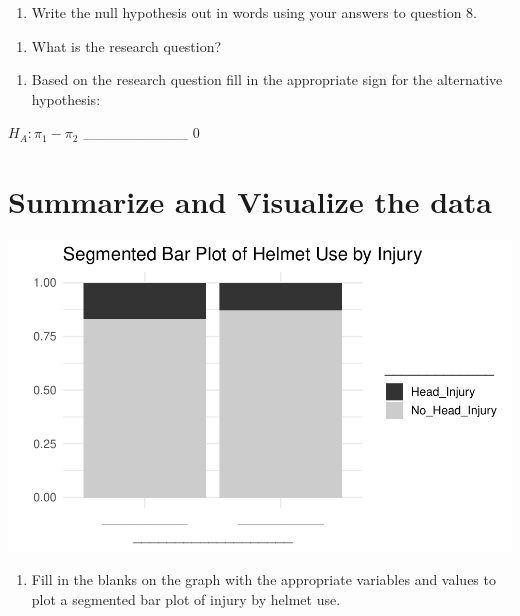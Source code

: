 \documentclass[
]{report}
\providecommand{\tightlist}{%
  \setlength{\itemsep}{0pt}\setlength{\parskip}{0pt}}
\begin{document}
\begin{enumerate}
\def\labelenumi{\arabic{enumi}.}
\setcounter{enumi}{8}
\tightlist
\item
  Write the null hypothesis out in words using your answers to question 8.
\end{enumerate}

\vspace{1in}

\begin{enumerate}
\def\labelenumi{\arabic{enumi}.}
\setcounter{enumi}{9}
\tightlist
\item
  What is the research question?
\end{enumerate}

\vspace{1in}

\begin{enumerate}
\def\labelenumi{\arabic{enumi}.}
\setcounter{enumi}{10}
\tightlist
\item
  Based on the research question fill in the appropriate sign for the alternative hypothesis:
  \vspace{0.25in}
\end{enumerate}

\(H_A: \pi_1 -\pi_2\) \_\_\_\_\_\_\_\_\_\_ 0

\hypertarget{summarize-and-visualize-the-data}{%
\section{Summarize and Visualize the data}\label{summarize-and-visualize-the-data}}

\begin{center}\includegraphics[width=0.7\linewidth]{07-inference-2cat_files/figure-latex/unnamed-chunk-2-1} \end{center}

\begin{enumerate}
\def\labelenumi{\arabic{enumi}.}
\setcounter{enumi}{11}
\tightlist
\item
  Fill in the blanks on the graph with the appropriate variables and values to plot a segmented bar plot of injury by helmet use.
\end{enumerate}
\end{document}
